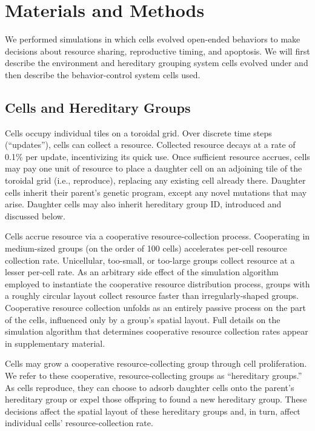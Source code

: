 \section{Materials and Methods}



We performed simulations in which cells evolved open-ended behaviors to make decisions about resource sharing, reproductive timing, and apoptosis.
We will first describe the environment and hereditary grouping system cells evolved under and then describe the behavior-control system cells used.

\subsection{Cells and Hereditary Groups}

Cells occupy individual tiles on a toroidal grid.
Over discrete time steps (``updates''), cells can collect a resource.
Collected resource decays at a rate of 0.1\% per update, incentivizing its quick use.
Once sufficient resource accrues, cells may pay one unit of resource to place a daughter cell on an adjoining tile of the toroidal grid (i.e., reproduce), replacing any existing cell already there.
Daughter cells inherit their parent's genetic program, except any novel mutations that may arise.
Daughter cells may also inherit hereditary group ID, introduced and discussed below.

Cells accrue resource via a cooperative resource-collection process.
Cooperating in medium-sized groups (on the order of 100 cells) accelerates per-cell resource collection rate.
Unicellular, too-small, or too-large groups collect resource at a lesser per-cell rate.
As an arbitrary side effect of the simulation algorithm employed to instantiate the cooperative resource distribution process, groups with a roughly circular layout collect resource faster than irregularly-shaped groups.
Cooperative resource collection unfolds as an entirely passive process on the part of the cells, influenced only by a group's spatial layout.
Full details on the simulation algorithm that determines cooperative resource collection rates appear in supplementary material.

Cells may grow a cooperative resource-collecting group through cell proliferation.
We refer to these cooperative, resource-collecting groups as ``hereditary groups.''
As cells reproduce, they can choose to adsorb daughter cells onto the parent's hereditary group or expel those offspring to found a new hereditary group.
These decisions affect the spatial layout of these hereditary groups and, in turn, affect individual cells' resource-collection rate.

